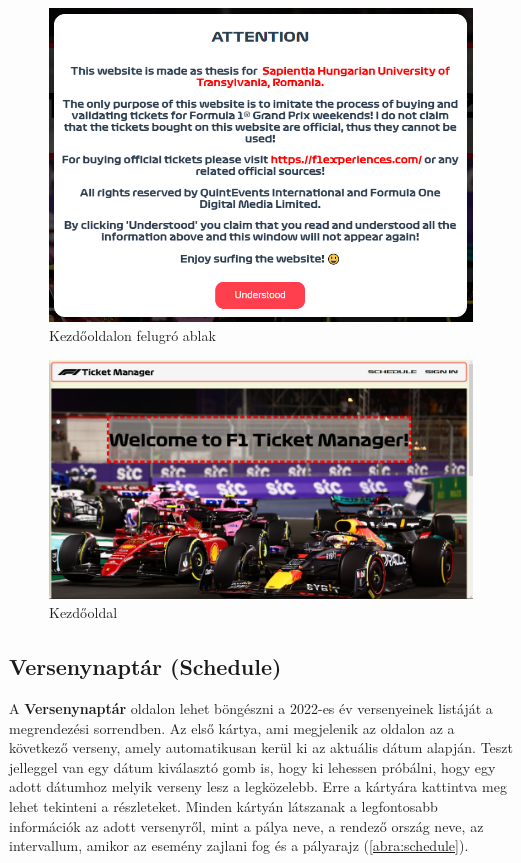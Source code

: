 \begin{figure}[!h]
	\centering
	\includegraphics[scale=0.4]{images/homepagePopup}
	\caption{Kezdőoldalon felugró ablak}
	\label{abra:homepagePopup}
\end{figure}
\pagebreak

\begin{figure}[!h]
	\centering
	\includegraphics[scale=0.2]{images/homepage}
	\caption{Kezdőoldal}
	\label{abra:homepage}
\end{figure}
\pagebreak

\subsection {Versenynaptár (Schedule)}

A \textbf{Versenynaptár} oldalon lehet böngészni a 2022-es év versenyeinek listáját a megrendezési sorrendben. Az első kártya, ami megjelenik az oldalon az a következő verseny, amely automatikusan kerül ki az aktuális dátum alapján. Teszt jelleggel van egy dátum kiválasztó gomb is, hogy ki lehessen próbálni, hogy egy adott dátumhoz melyik verseny lesz a legközelebb. Erre a kártyára kattintva meg lehet tekinteni a részleteket. Minden kártyán látszanak a legfontosabb információk az adott versenyről, mint a pálya neve, a rendező ország neve, az intervallum, amikor az esemény zajlani fog és a pályarajz (\ref{abra:schedule}).

